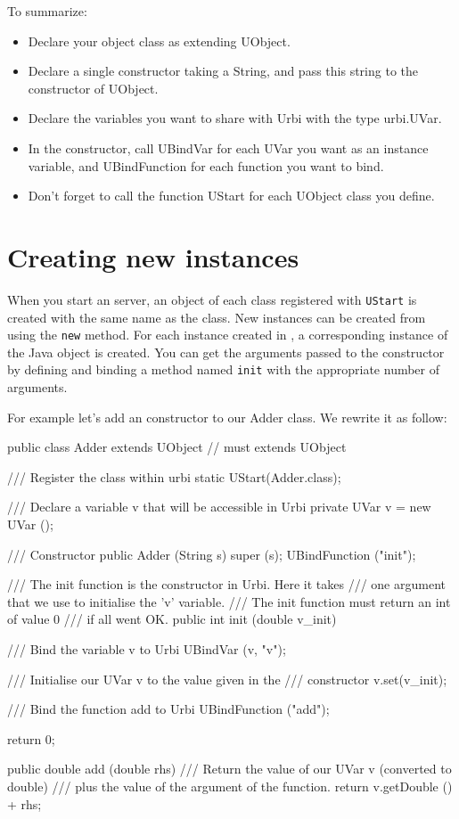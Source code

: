 To summarize:

\begin{itemize}
\item Declare your object class as extending UObject.
\item Declare a single constructor taking a String, and pass this string to
  the constructor of UObject.
\item Declare the variables you want to share with Urbi with the type
  urbi.UVar.
\item In the constructor, call UBindVar for each UVar you want as an
  instance variable, and UBindFunction for each function you want to bind.
\item Don't forget to call the function UStart for each UObject class you define.
\end{itemize}

\section{Creating new instances}
\label{sec:uob:apijava:new}

When you start an \urbi server, an object of each class registered with
\lstinline{UStart} is created with the same name as the class. New instances
can be created from \urbi using the \lstinline|new| method. For each
instance created in \urbi, a corresponding instance of the Java object is
created. You can get the arguments passed to the constructor by defining and
binding a method named \lstinline|init| with the appropriate number of
arguments.

For example let's add an \urbi constructor to our Adder class. We rewrite
it as follow:

\begin{cxx}
public class Adder extends UObject // must extends UObject
{
    /// Register the class within urbi
    static { UStart(Adder.class); }

    /// Declare a variable v that will be accessible in Urbi
    private UVar v = new UVar ();

    /// Constructor
    public Adder (String s) {
    	super (s);
	UBindFunction ("init");
    }

    /// The init function is the constructor in Urbi. Here it takes
    /// one argument that we use to initialise the 'v' variable.
    /// The init function must return an int of value 0
    /// if all went OK.
    public int init (double v_init) {

	/// Bind the variable v to Urbi
	UBindVar (v, "v");

	/// Initialise our UVar v to the value given in the
	/// constructor
	v.set(v_init);

	/// Bind the function add to Urbi
	UBindFunction ("add");

	return 0;
    }

    public double add (double rhs) {
    	/// Return the value of our UVar v (converted to double)
    	/// plus the value of the argument of the function.
    	return v.getDouble () + rhs;
    }
}
\end{cxx}

